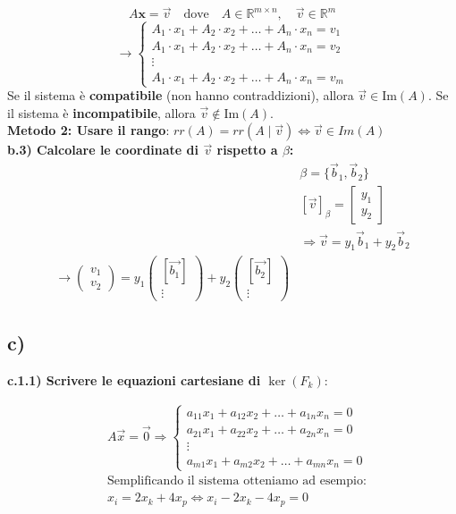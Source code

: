 \documentclass[a4paper,12pt]{article}
\begin{document}
\[
A \mathbf{x} = \vec{v} \quad \text{dove} \quad A \in \mathbb{R}^{m \times n}, \quad \vec{v} \in \mathbb{R}^m
\]
\[
\to \begin{cases}
A_{1} \cdot x_1 + A_{2} \cdot x_2 + \dots + A_n \cdot x_n = v_1 \\
A_{1} \cdot x_1 + A_{2} \cdot x_2 + \dots + A_n \cdot x_n = v_2 \\
\vdots \\
A_{1} \cdot x_1 + A_{2} \cdot x_2 + \dots + A_n \cdot x_n = v_m
\end{cases}
\]
Se il sistema è \textbf{compatibile} (non hanno contraddizioni), allora \( \vec{v} \in \text{Im}(A) \). Se il sistema è \textbf{incompatibile}, allora \( \vec{v} \notin \text{Im}(A) \). \\
\textbf{Metodo 2: Usare il rango}: $rr(A)=rr(A\mid \vec{v}) \iff \vec{v} \in Im(A)$  \\
\vspace{1em}
\textbf{b.3) Calcolare le coordinate di $\vec{v}$ rispetto a $\beta$:}
\begin{align*}
    &\beta = \{\vec{b}_1, \vec{b}_2\} \\
    &[\vec{v}]_{\beta} = \begin{bmatrix} y_1 \\ y_2 \end{bmatrix} \\
    &\Rightarrow \vec{v} = y_1 \vec{b}_1 + y_2 \vec{b}_2\\
    \to \begin{pmatrix}
        v_1\\
        v_2
    \end{pmatrix}=y_1\begin{pmatrix}
        [\vec{b_1}]\\
        \vdots
    \end{pmatrix}
    +y_2\begin{pmatrix}
        [\vec{b_2}]\\
        \vdots
    \end{pmatrix}
\end{align*}
\subsection*{c)}
\textbf{c.1.1) Scrivere le equazioni cartesiane di $\ker(F_k)$}:

\begin{align*}
    &A\vec{x} = \vec{0} \Rightarrow 
    \begin{cases}
        a_{11}x_1 + a_{12}x_2 + \dots + a_{1n}x_n = 0 \\
        a_{21}x_1 + a_{22}x_2 + \dots + a_{2n}x_n = 0 \\
        \vdots \\
        a_{m1}x_1 + a_{m2}x_2 + \dots + a_{mn}x_n = 0
    \end{cases} \\
    &\text{Semplificando il sistema otteniamo ad esempio:} \\
    &x_i = 2x_k + 4x_p \iff \boxed{x_i - 2x_k - 4x_p = 0}
\end{align*}
\end{document}

